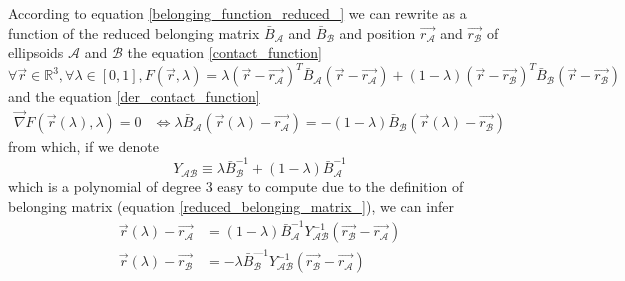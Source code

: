 \documentclass[class=report, float=false, crop=false]{standalone}
\begin{document}
According to equation \ref{belonging_function_reduced_} we can rewrite as a function of the reduced belonging matrix $\bar{B}_{\mathcal{A}}$ and $\bar{B}_{\mathcal{B}}$ and position $\vec{r_{\mathcal{A}}}$ and $\vec{r_{\mathcal{B}}}$ of ellipsoids $\mathcal{A}$ and $\mathcal{B}$ the equation \ref{contact_function}
\begin{equation}
\forall \vec{r} \in \mathbb{R}^3, \forall \lambda \in [0,1], F(\vec{r},\lambda) = \lambda(\vec{r}-\vec{r_{\mathcal{A}}})^T\bar{B}_{\mathcal{A}}(\vec{r}-\vec{r_{\mathcal{A}}}) + (1-\lambda)(\vec{r}-\vec{r_{\mathcal{B}}})^T\bar{B}_{\mathcal{B}}(\vec{r}-\vec{r_{\mathcal{B}}})
\label{contact_function_reduced}
\end{equation}
and the equation \ref{der_contact_function}
\begin{align*}
\vec{\nabla}F(\vec{r}(\lambda),\lambda) = 0 &\Leftrightarrow \lambda \bar{B}_{\mathcal{A}}(\vec{r}(\lambda) - \vec{r_{\mathcal{A}}}) = - (1 - \lambda)  \bar{B}_{\mathcal{B}}(\vec{r}(\lambda) - \vec{r_{\mathcal{B}}})
\end{align*}
from which, if we denote
\begin{equation}
Y_{\mathcal{A}\mathcal{B}} \equiv \lambda \bar{B}_{\mathcal{B}}^{-1} + (1 - \lambda)\bar{B}_{\mathcal{A}}^{-1}
\end{equation}
which is a polynomial of degree 3 easy to compute due to the definition of belonging matrix (equation \ref{reduced_belonging_matrix_}), we can infer
\begin{equation}
\begin{aligned}
\vec{r}(\lambda) - \vec{r_{\mathcal{A}}} &= (1 - \lambda)\bar{B}_{\mathcal{A}}^{-1}Y_{\mathcal{A}\mathcal{B}}^{-1}(\vec{r_{\mathcal{B}}} - \vec{r_{\mathcal{A}}})\\
\vec{r}(\lambda) - \vec{r_{\mathcal{B}}} &= - \lambda \bar{B}_{\mathcal{B}}^{—1}Y_{\mathcal{A}\mathcal{B}}^{-1}(\vec{r_{\mathcal{B}}} - \vec{r_{\mathcal{A}}})
\label{rarlrbrl}
\end{aligned}
\end{equation}
\end{document}
